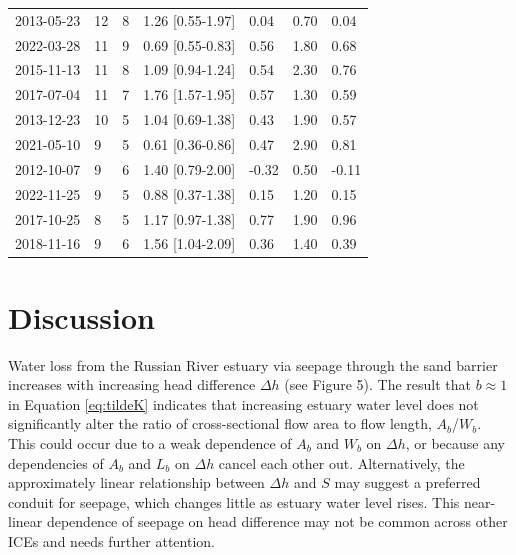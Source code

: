 \documentclass[preprint,12pt,authoryear]{elsarticle}
\begin{document}
\begin{table}[]
\begin{tabular}{lllll|ll}
2013-05-23 & 12 & 8 & 1.26 [0.55-1.97] & 0.04 & 0.70 & 0.04 \\
2022-03-28 & 11 & 9 & 0.69 [0.55-0.83] & 0.56 & 1.80 & 0.68 \\
2015-11-13 & 11 & 8 & 1.09 [0.94-1.24] & 0.54 & 2.30 & 0.76 \\
2017-07-04 & 11 & 7 & 1.76 [1.57-1.95] & 0.57 & 1.30 & 0.59 \\
2013-12-23 & 10 & 5 & 1.04 [0.69-1.38] & 0.43 & 1.90 & 0.57 \\
2021-05-10 & 9 & 5 & 0.61 [0.36-0.86] & 0.47 & 2.90 & 0.81 \\
2012-10-07 & 9 & 6 & 1.40 [0.79-2.00] & -0.32 & 0.50 & -0.11 \\
2022-11-25 & 9 & 5 & 0.88 [0.37-1.38] & 0.15 & 1.20 & 0.15 \\
2017-10-25 & 8 & 5 & 1.17 [0.97-1.38] & 0.77 & 1.90 & 0.96 \\
2018-11-16 & 9 & 6 & 1.56 [1.04-2.09] & 0.36 & 1.40 & 0.39 \\
\end{tabular}
    \label{tab:closures}
\end{table}


\section{Discussion}



Water loss from the Russian River estuary via seepage through the sand barrier  increases with increasing head difference $\Delta h$ (see Figure 5).
The result that $b \approx 1$ in Equation \ref{eq:tildeK} indicates that increasing estuary water level does not significantly alter the ratio of cross-sectional flow area to flow length, $A_b$/$W_b$. This could occur due to a weak dependence of $A_b$ and $W_b$ on $\Delta h$, or because any dependencies of $A_b$ and $L_b$ on $\Delta h$ cancel each other out. 
Alternatively, the approximately linear relationship between $\Delta h$ and $S$ may suggest a preferred conduit for seepage, which changes little as estuary water level rises. This near-linear dependence of seepage on head difference may not be common across other ICEs and needs further attention.  
\end{document}
